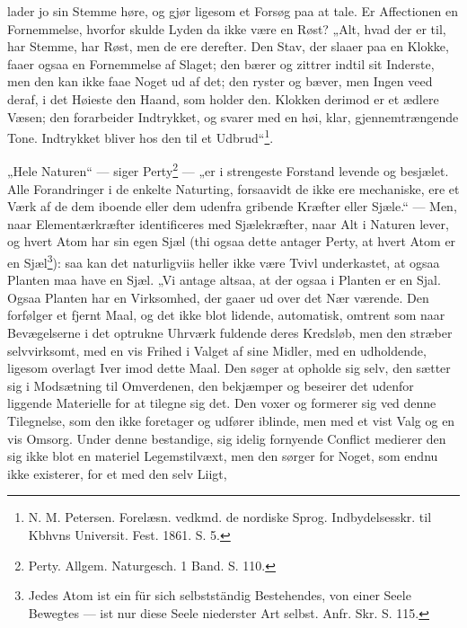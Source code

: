 \documentclass[11pt]{book}
\newcommand{\opage}[1]{\marginnote{\footnotesize\textit{[#1]}}}
\begin{document}
\opage{332} \setcounter{footnote}{0}%
lader jo sin Stemme høre, og gjør ligesom et Forsøg paa at tale. Er
Affectionen en Fornemmelse, hvorfor skulde Lyden da ikke være en Røst? „Alt,
hvad der er til, har Stemme, har Røst, men de ere derefter. Den Stav, der
slaaer paa en Klokke, faaer ogsaa en Fornemmelse af Slaget; den bærer og
zittrer indtil sit Inderste, men den kan ikke faae Noget ud af det; den
ryster og bæver, men Ingen veed deraf, i det Høieste den Haand, som holder
den. Klokken derimod er et ædlere Væsen; den forarbeider Indtrykket, og
svarer med en høi, klar, gjennemtrængende Tone. Indtrykket bliver hos den til
et Udbrud“\footnote{%
N. M. Petersen. Forelæsn. vedkmd. de nordiske Sprog. Indbydelsesskr. til
Kbhvns Universit. Fest. 1861. S. 5.}.

„Hele Naturen“ --- siger Perty\footnote{%
Perty. Allgem. Naturgesch. 1 Band. S. 110.} --- „er i strengeste Forstand
levende og besjælet. Alle Forandringer i de enkelte Naturting, forsaavidt de
ikke ere mechaniske, ere et Værk af de dem iboende eller dem udenfra gribende
Kræfter eller Sjæle.“ --- Men, naar Elementærkræfter identificeres med
Sjælekræfter, naar Alt i Naturen lever, og hvert Atom har sin egen Sjæl (thi
ogsaa dette antager Perty, at hvert Atom er en Sjæl\footnote{%
Jedes Atom ist ein für sich selbstständig Bestehendes, von einer Seele
Bewegtes --- ist nur diese Seele niederster Art selbst. Anfr. Skr. S. 115.}):
saa kan det naturligviis heller ikke være Tvivl underkastet, at ogsaa Planten
maa have en Sjæl. „Vi antage altsaa, at der ogsaa i Planten er en Sjal.
Ogsaa Planten har en Virksomhed, der gaaer ud over det Nær\-%
\opage{333} \setcounter{footnote}{0}%
værende. Den forfølger et fjernt Maal, og det ikke blot lidende, automatisk,
omtrent som naar Bevægelserne i det optrukne Uhrværk fuldende deres Kredsløb,
men den stræber selvvirksomt, med en vis Frihed i Valget af sine Midler, med
en udholdende, ligesom overlagt Iver imod dette Maal. Den søger at opholde
sig selv, den sætter sig i Modsætning til Omverdenen, den bekjæmper og
beseirer det udenfor liggende Materielle for at tilegne sig det. Den voxer og
formerer sig ved denne Tilegnelse, som den ikke foretager og udfører iblinde,
men med et vist Valg og en vis Omsorg. Under denne bestandige, sig idelig
fornyende Conflict medierer den sig ikke blot en materiel Legemstilvæxt, men
den sørger for Noget, som endnu ikke existerer, for et med den selv Liigt,
\end{document}
